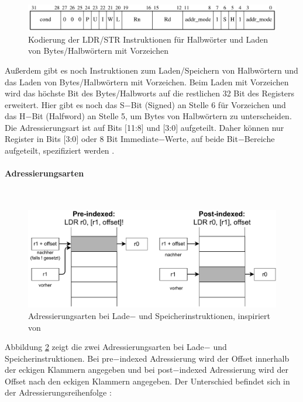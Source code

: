 \documentclass[a4paper, 11pt, onecolumn]{article}
\begin{document}
\begin{figure}[!htb]
\centering
\includegraphics[width=1\textwidth]{data/ldrstrh}
\caption[Kodierung LDR/STR für Halbwörter]{Kodierung der LDR/STR Instruktionen für Halbwörter und Laden von Bytes/Halbwörtern mit Vorzeichen \cite{arm:2005}}
\label{fig:ldrstrh}
\end{figure}

Außerdem gibt es noch Instruktionen zum Laden/Speichern von Halbwörtern und das Laden von Bytes/Halbwörtern mit Vorzeichen. Beim Laden mit Vorzeichen wird das höchste Bit des Bytes/Halbworts auf die restlichen 32 Bit des Registers erweitert. Hier gibt es noch das S$-$Bit (Signed) an Stelle 6 für Vorzeichen und das H$-$Bit (Halfword) an Stelle 5, um Bytes von Halbwörtern zu unterscheiden. Die Adressierungsart ist auf Bits $[$11:8$]$ und $[$3:0$]$ aufgeteilt. Daher können nur Register in Bits $[$3:0$]$ oder 8 Bit Immediate$-$Werte, auf beide Bit$-$Bereiche aufgeteilt, spezifiziert werden \cite{arm:2005}.

\paragraph{Adressierungsarten}\label{sec:ldrstraddr}
~\\
\begin{figure}[!htb]
\centering
\includegraphics[width=1\textwidth]{data/offset}
\caption[Adressierungsarten LDR/STR]{Adressierungsarten bei Lade$-$ und Speicherinstruktionen, inspiriert von \cite{assembly}}
\label{fig:offset}
\end{figure}

Abbildung \ref{fig:offset} zeigt die zwei Adressierungsarten bei Lade$-$ und Speicherinstruktionen. Bei pre$-$indexed Adressierung wird der Offset innerhalb der eckigen Klammern angegeben und bei post$-$indexed Adressierung wird der Offset nach den eckigen Klammern angegeben. Der Unterschied befindet sich in der Adressierungsreihenfolge \cite{arm:2005}:
\end{document}
